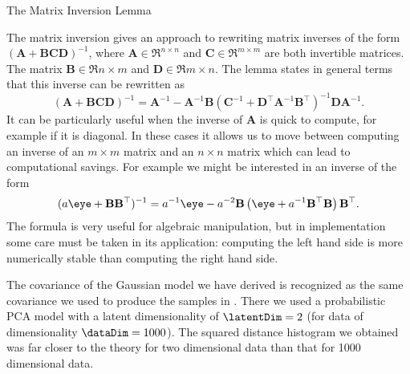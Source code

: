 \begin{boxfloat}
  \caption{The Matrix Inversion Lemma}\label{box:inversion}
  
  \boxfontsize The matrix inversion gives an approach to rewriting
  matrix inverses of the form $(\mathbf{A} +
  \mathbf{B}\mathbf{C}\mathbf{D})^{-1}$, where
  $\mathbf{A}\in\Re^{n\times n}$ and $\mathbf{C}\in \Re^{m\times m}$
  are both invertible matrices. The matrix $\mathbf{B}\in \Re{n
    \times m}$ and $\mathbf{D}\in \Re{m\times n}$. The lemma states
  in general terms that this inverse can be rewritten as
  \[
  (\mathbf{A} + \mathbf{B}\mathbf{C}\mathbf{D})^{-1} = \mathbf{A}^{-1}
  - \mathbf{A}^{-1}\mathbf{B}\left(\mathbf{C}^{-1} +
    \mathbf{D}^\top\mathbf{A}^{-1}\mathbf{B}^\top\right)^{-1}\mathbf{D}\mathbf{A}^{-1}.
  \]
  It can be particularly useful when the inverse of $\mathbf{A}$ is
  quick to compute, for example if it is diagonal. In these cases it
  allows us to move between computing an inverse of an $m\times m$
  matrix and an $n \times n$ matrix which can lead to computational
  savings. For example we might be interested in an inverse of the form
  \[
  (a\eye + \mathbf{B}\mathbf{B}^\top)^{-1} = a^{-1}\eye - a^{-2}\mathbf{B}\left(\eye + a^{-1}\mathbf{B}^\top\mathbf{B}\right)\mathbf{B}^\top.
  \]
  The formula is very useful for algebraic manipulation, but in
  implementation some care must be taken in its application: computing
  the left hand side is more numerically stable than computing the
  right hand side.
\end{boxfloat}

The covariance of the Gaussian model we have derived is recognized as
the same covariance we used to produce the samples in
. There we used a probabilistic PCA model with
a latent dimensionality of $\latentDim=2$ (for data of dimensionality
$\dataDim=1000$). The squared distance histogram we obtained was far
closer to the theory for two dimensional data than that for 1000
dimensional data.




